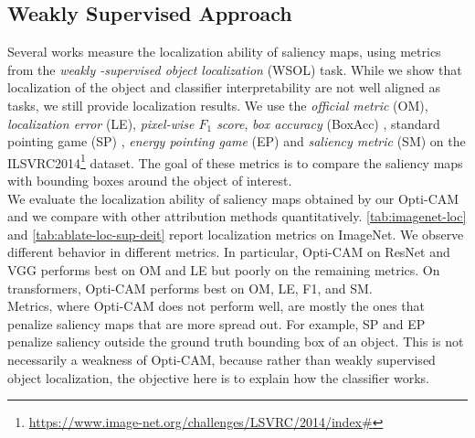 \subsection{Weakly Supervised Approach}
\label{sec:oc_wsol}
Several works measure the localization ability of saliency maps, using metrics from the \emph{weakly
-supervised object localization} (WSOL) task. While we show that localization of the object and 
classifier interpretability are not well aligned as tasks, we still provide localization results. 
We use the \emph{official metric} (OM), \emph{localization error} (LE), \emph{pixel-wise $F_1$ 
score}, \emph{box accuracy} (BoxAcc) \autocite{choe2020evaluating}, standard pointing game (SP) 
\autocite{zhang2018top}, \emph{energy pointing game} (EP) \autocite{wang2020score} and 
\emph{saliency metric} (SM) \autocite{dabkowski2017real} on the ILSVRC2014\footnote{\url{
https://www.image-net.org/challenges/LSVRC/2014/index\#}} dataset. 
The goal of these metrics is to compare the saliency maps with bounding boxes around the object 
of interest. \\

\noindent We evaluate the localization ability of saliency maps obtained by our Opti-CAM and we 
compare with other attribution methods quantitatively. \autoref{tab:imagenet-loc} and 
\autoref{tab:ablate-loc-sup-deit} report localization metrics on ImageNet. We observe different 
behavior in different metrics. In particular, Opti-CAM on ResNet and VGG performs best on OM and 
LE but poorly on the remaining metrics. On transformers, Opti-CAM performs best on OM, LE, F1, and 
SM.\\




\noindent Metrics, where Opti-CAM does not perform well, are mostly the ones that penalize saliency 
maps that are more spread out. For example, SP and EP penalize saliency outside the ground truth 
bounding box of an object. This is not necessarily a weakness of Opti-CAM, because rather than 
weakly supervised object localization, the objective here is to explain how the classifier works.